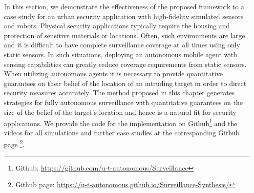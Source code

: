 In this section, we demonstrate the effectiveness of the proposed framework to a case study for an urban security application with high-fidelity simulated sensors and robots. 
Physical security applications typically require the housing and protection of sensitive materials or locations. Often, such environments are large and it is difficult to have complete surveillance coverage at all times using only static sensors. In such situations, deploying an autonomous mobile agent with sensing capabilities can greatly reduce coverage requirements from static sensors. When utilizing autonomous agents it is necessary to provide quantitative guarantees on their belief of the location of an intruding target in order to direct security measures accurately. The method proposed in this chapter generates strategies for fully autonomous surveillance with quantitative guarantees on the size of the belief of the target's location and hence is a natural fit for security applications. 
We provide the code for the implementation on Github\footnote{Github: \url{https://github.com/u-t-autonomous/Surveillance}} and the videos for all simulations and further case studies at the corresponding Github page \footnote{Github page: \url{https://u-t-autonomous.github.io/Surveillance-Synthesis/}}.



